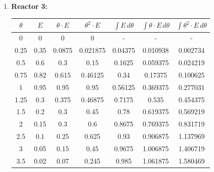 \begin{enumerate}[label={\alph*)}]
	\item \textbf{Reactor 3:}
	      \begin{center}
		      \begin{tabular}{|c|c|c|c|c|c|c|}
			      \hline
			      $\theta$ & $E$  & $\theta \cdot E$ & $\theta^2 \cdot E$ & $\int E \, d\theta$ & $\int \theta \cdot E \, d\theta$ & $\int \theta^2 \cdot E \, d\theta$ \\ \hline
			      0        & 0    & 0                & 0                  & -                   & -                                & -                                  \\ \hline
			      0.25     & 0.35 & 0.0875           & 0.021875           & 0.04375             & 0.010938                         & 0.002734                           \\ \hline
			      0.5      & 0.6  & 0.3              & 0.15               & 0.1625              & 0.059375                         & 0.024219                           \\ \hline
			      0.75     & 0.82 & 0.615            & 0.46125            & 0.34                & 0.17375                          & 0.100625                           \\ \hline
			      1        & 0.95 & 0.95             & 0.95               & 0.56125             & 0.369375                         & 0.277031                           \\ \hline
			      1.25     & 0.3  & 0.375            & 0.46875            & 0.7175              & 0.535                            & 0.454375                           \\ \hline
			      1.5      & 0.2  & 0.3              & 0.45               & 0.78                & 0.619375                         & 0.569219                           \\ \hline
			      2        & 0.15 & 0.3              & 0.6                & 0.8675              & 0.769375                         & 0.831719                           \\ \hline
			      2.5      & 0.1  & 0.25             & 0.625              & 0.93                & 0.906875                         & 1.137969                           \\ \hline
			      3        & 0.05 & 0.15             & 0.45               & 0.9675              & 1.006875                         & 1.406719                           \\ \hline
			      3.5      & 0.02 & 0.07             & 0.245              & 0.985               & 1.061875                         & 1.580469                           \\ \hline

\end{tabular}
\end{center}
\end{enumerate}
